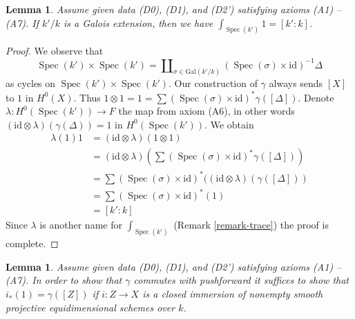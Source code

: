 \documentclass{stacks-project}
\theoremstyle{plain}
\newtheorem{lemma}[subsection]{Lemma}
\theoremstyle{definition}
\theoremstyle{remark}
\numberwithin{equation}{subsection}
\def\Spec{\mathop{\mathrm{Spec}}}
\begin{document}
\begin{lemma}
\label{lemma-integrate-1}
Assume given data (D0), (D1), and (D2') satisfying axioms (A1) -- (A7).
If $k'/k$ is a Galois extension, then we have
$\int_{\Spec(k')} 1 = [k' : k]$.
\end{lemma}

\begin{proof}
We observe that
$$
\Spec(k') \times \Spec(k') =
\coprod\nolimits_{\sigma \in \text{Gal}(k'/k)}
(\Spec(\sigma) \times \text{id})^{-1} \Delta
$$
as cycles on $\Spec(k') \times \Spec(k')$.
Our construction of $\gamma$ always sends $[X]$ to $1$ in $H^0(X)$. Thus
$1 \otimes 1 = 1 = \sum (\Spec(\sigma) \times \text{id})^*\gamma([\Delta])$.
Denote $\lambda : H^0(\Spec(k')) \to F$ the map from
axiom (A6), in other words $(\text{id} \otimes \lambda)(\gamma(\Delta)) = 1$
in $H^0(\Spec(k'))$. We obtain
\begin{align*}
\lambda(1) 1
& =
(\text{id} \otimes \lambda)(1 \otimes 1) \\
& =
(\text{id} \otimes \lambda)(
\sum (\Spec(\sigma) \times \text{id})^*\gamma([\Delta])) \\
& =
\sum (\Spec(\sigma) \times \text{id})^*(
(\text{id} \otimes \lambda)(\gamma([\Delta])) \\
& =
\sum (\Spec(\sigma) \times \text{id})^*(1) \\
& =
[k' : k]
\end{align*}
Since $\lambda$ is another name for $\int_{\Spec(k')}$
(Remark \ref{remark-trace}) the proof is complete.
\end{proof}

\begin{lemma}
\label{lemma-enough}
Assume given data (D0), (D1), and (D2') satisfying axioms (A1) -- (A7).
In order to show that $\gamma$ commutes with pushforward it suffices
to show that $i_*(1) = \gamma([Z])$ if $i : Z \to X$ is a closed
immersion of nonempty smooth projective equidimensional schemes over $k$.
\end{lemma}
\end{document}

